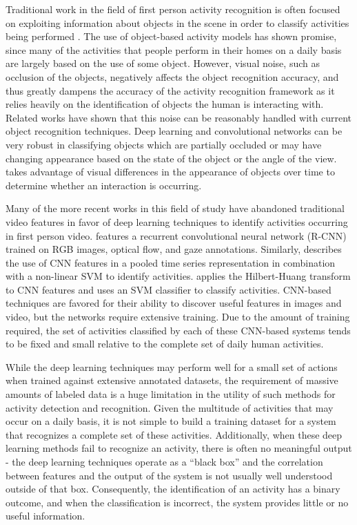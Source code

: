 \documentclass[12pt]{report}
\begin{document}
Traditional work in the field of first person activity recognition is often focused on exploiting information about objects in the scene in order to classify activities being performed \cite{Nakatani2019, McCandless2013, Pirsiavash2012, Sudhakaran2018, Wang2018}. The use of object-based activity models has shown promise, since many of the activities that people perform in their homes on a daily basis are largely based on the use of some object. However, visual noise, such as occlusion of the objects, negatively affects the object recognition accuracy, and thus greatly dampens the accuracy of the activity recognition framework as it relies heavily on the identification of objects the human is interacting with. Related works have shown that this noise can be reasonably handled with current object recognition techniques. Deep learning and convolutional networks can be very robust in classifying objects which are partially occluded or may have changing appearance based on the state of the object or the angle of the view. \cite{Pirsiavash2012} takes advantage of visual differences in the appearance of objects over time to determine whether an interaction is occurring.

Many of the more recent works in this field of study have abandoned traditional video features in favor of deep learning techniques to identify activities occurring in first person video.   \cite{Li} features a recurrent convolutional neural network (R-CNN) trained on RGB images, optical flow, and gaze annotations. Similarly, \cite{Ryoo2015} describes the use of CNN features in a pooled time series representation in combination with a non-linear SVM to identify activities. \cite{Purwanto2017} applies the Hilbert-Huang transform to CNN features and uses an SVM classifier to classify activities. CNN-based techniques are favored for their ability to discover useful features in images and video, but the networks require extensive training. Due to the amount of training required, the set of activities classified by each of these CNN-based systems tends to be fixed and small relative to the complete set of daily human activities.

While the deep learning techniques may perform well for a small set of actions when trained against extensive annotated datasets, the requirement of massive amounts of labeled data is a huge limitation in the utility of such methods for activity detection and recognition. Given the multitude of activities that may occur on a daily basis, it is not simple to build a training dataset for a system that recognizes a complete set of these activities. Additionally, when these deep learning methods fail to recognize an activity, there is often no meaningful output - the deep learning techniques operate as a “black box” and the correlation between features and the output of the system is not usually well understood outside of that box. Consequently, the identification of an activity has a binary outcome, and when the classification is incorrect, the system provides little or no useful information.
\end{document}
